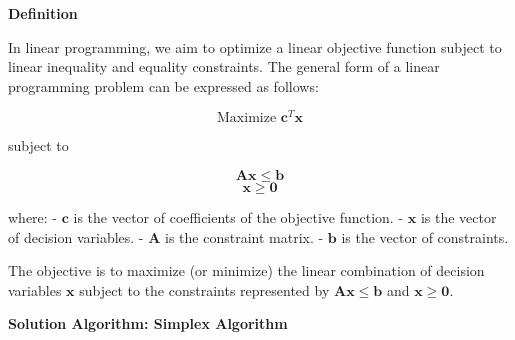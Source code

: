 \documentclass[12pt]{book} %
\begin{document}
\textbf{Definition}

In linear programming, we aim to optimize a linear objective function subject to linear inequality and equality constraints. The general form of a linear programming problem can be expressed as follows:

\[
\text{Maximize } \mathbf{c}^T \mathbf{x}
\]

subject to

\[
\mathbf{Ax} \leq \mathbf{b}
\]
\[
\mathbf{x} \geq \mathbf{0}
\]

where:
- \( \mathbf{c} \) is the vector of coefficients of the objective function.
- \( \mathbf{x} \) is the vector of decision variables.
- \( \mathbf{A} \) is the constraint matrix.
- \( \mathbf{b} \) is the vector of constraints.

The objective is to maximize (or minimize) the linear combination of decision variables \( \mathbf{x} \) subject to the constraints represented by \( \mathbf{Ax} \leq \mathbf{b} \) and \( \mathbf{x} \geq \mathbf{0} \).

\textbf{Solution Algorithm: Simplex Algorithm}
\end{document}
